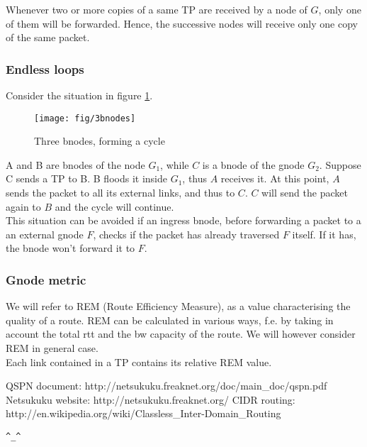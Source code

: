 \documentclass[a4paper]{article}
\newcommand{\href}[2]{ #1 }
\begin{document}
Whenever two or more copies of a same TP are received by a node
of $G$, only one of them will be forwarded. Hence, the successive nodes will
receive only one copy of the same packet.

\subsubsection{Endless loops}
Consider the situation in figure \ref{fig:3bnodes}.
\begin{figure}[h]
	\begin{center}
		\texttt{[image: fig/3bnodes]}
	\end{center}
	\caption{Three bnodes, forming a cycle}
	\label{fig:3bnodes}
\end{figure}
A and B are bnodes of the node $G_1$, while $C$ is a bnode of the gnode $G_2$.
Suppose C sends a TP to B. B floods it inside $G_1$, thus $A$ receives it. At
this point, $A$ sends the packet to all its external links, and thus to $C$.
$C$ will send the packet again to $B$ and the cycle will continue.\\

This situation can be avoided if an ingress bnode, before forwarding a packet to a an
external gnode $F$, checks if the packet has already traversed $F$ itself. If
it has, the bnode won't forward it to $F$.

\subsubsection{Gnode metric}
We will refer to REM (Route Efficiency Measure), as a value characterising the
quality of a route. REM can be calculated in various ways, f.e. by taking in
account the total rtt and the bw capacity of the route. We will however
consider REM in general case.\\

Each link contained in a TP contains its relative REM value.








\begin{thebibliography}{99}
	 QSPN document:
		\href{http://netsukuku.freaknet.org/doc/main\_doc/qspn.pdf}{qspn.pdf}
	 Netsukuku website:
		\href{http://netsukuku.freaknet.org/}{http://netsukuku.freaknet.org/}
	 CIDR routing:
		\href{http://en.wikipedia.org/wiki/Classless\_Inter-Domain\_Routing}{Classless\_Inter-Domain\_Routing in Wikipedia}
\end{thebibliography}
\newpage

\begin{center}
\verb|^_^|
\end{center}
\end{document}
